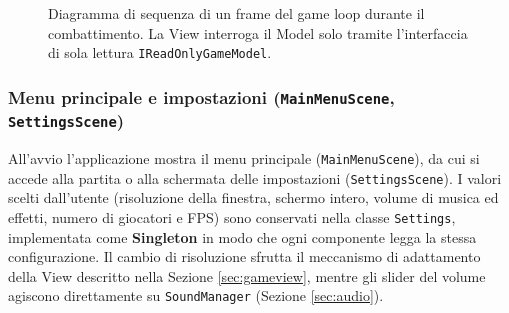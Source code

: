 \documentclass[11pt, a4paper]{article}
\begin{document}
	\begin{figure}[H]
		\centering
		\caption{Diagramma di sequenza di un frame del game loop durante il combattimento. La View interroga il Model solo tramite l'interfaccia di sola lettura \texttt{IReadOnlyGameModel}.}
		\label{fig:seq_gameloop}
	\end{figure}
	
	\subsubsection{Menu principale e impostazioni (\texttt{MainMenuScene}, \texttt{SettingsScene})}
	All'avvio l'applicazione mostra il menu principale (\texttt{MainMenuScene}), da cui si accede alla partita o alla schermata delle impostazioni (\texttt{SettingsScene}). I valori scelti dall'utente (risoluzione della finestra, schermo intero, volume di musica ed effetti, numero di giocatori e FPS) sono conservati nella classe \texttt{Settings}, implementata come \textbf{Singleton} in modo che ogni componente legga la stessa configurazione. Il cambio di risoluzione sfrutta il meccanismo di adattamento della View descritto nella Sezione \ref{sec:gameview}, mentre gli slider del volume agiscono direttamente su \texttt{SoundManager} (Sezione \ref{sec:audio}). 
	
\end{document}
